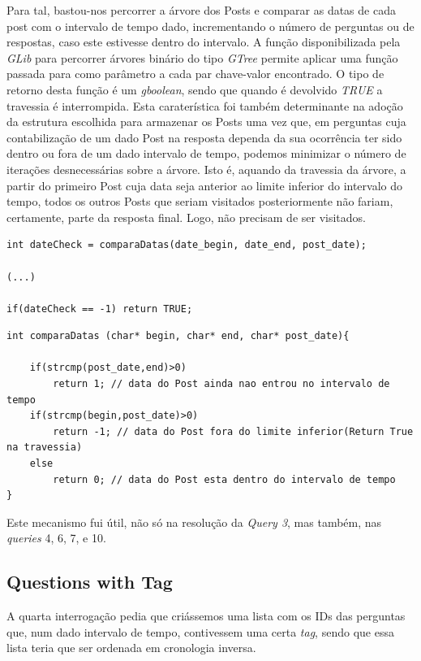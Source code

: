 \documentclass[a4paper, 11pt, oneside]{article}
\begin{document}
Para tal, bastou-nos percorrer a árvore dos Posts e comparar as datas de cada post com o intervalo de tempo dado, incrementando o número de perguntas ou de respostas, caso este estivesse dentro do intervalo. A função disponibilizada pela \textit{GLib} para percorrer árvores binário do tipo \textit{GTree} permite aplicar uma função passada para como parâmetro a cada par chave-valor encontrado. O tipo de retorno desta função é um \textit{gboolean}, sendo que quando é devolvido \textit{TRUE} a travessia é interrompida. Esta caraterística foi também determinante na adoção da estrutura escolhida para armazenar os Posts uma vez que, em perguntas cuja contabilização de um dado Post na resposta dependa da sua ocorrência ter sido dentro ou fora de um dado intervalo de tempo, podemos minimizar o número de iterações desnecessárias sobre a árvore. Isto é, aquando da travessia da árvore, a partir do primeiro Post cuja data seja anterior ao limite inferior do intervalo do tempo, todos os outros Posts que seriam visitados posteriormente não fariam, certamente, parte da resposta final. Logo, não precisam de ser visitados. 

\begin{lstlisting}[caption=Query 3 - mecanismo de diminuição de iterações desnecessárias]
int dateCheck = comparaDatas(date_begin, date_end, post_date);

(...)

if(dateCheck == -1) return TRUE; 
\end{lstlisting}

\begin{lstlisting}[caption=Implementação da função comparaDatas]
int comparaDatas (char* begin, char* end, char* post_date){ 

	if(strcmp(post_date,end)>0) 
		return 1; // data do Post ainda nao entrou no intervalo de tempo 
	if(strcmp(begin,post_date)>0) 
		return -1; // data do Post fora do limite inferior(Return True na travessia)
	else 
		return 0; // data do Post esta dentro do intervalo de tempo
}
\end{lstlisting}

Este mecanismo fui útil, não só na resolução da \textit{Query 3}, mas também, nas \textit{queries} 4, 6, 7, e 10. 

\subsection{Questions with Tag}
A quarta interrogação pedia que criássemos uma lista com os IDs das perguntas que, num dado intervalo de tempo, contivessem uma certa \textit{tag}, sendo que essa lista teria que ser ordenada em cronologia inversa.
\end{document}
